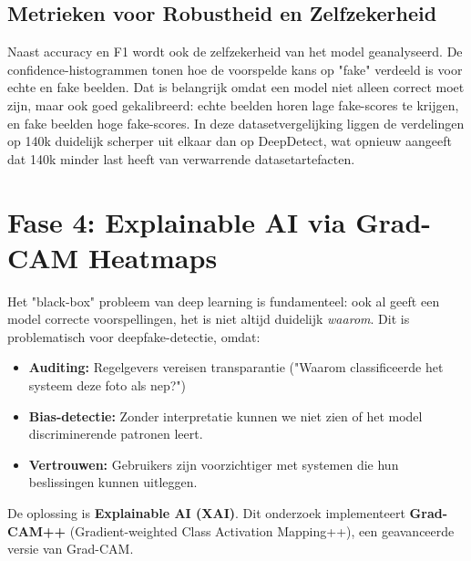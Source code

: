 \subsection{Metrieken voor Robustheid en Zelfzekerheid}

Naast accuracy en F1 wordt ook de zelfzekerheid van het model geanalyseerd. De confidence-histogrammen tonen hoe de voorspelde kans op "fake" verdeeld is voor echte en fake beelden. Dat is belangrijk omdat een model niet alleen correct moet zijn, maar ook goed gekalibreerd: echte beelden horen lage fake-scores te krijgen, en fake beelden hoge fake-scores. In deze datasetvergelijking liggen de verdelingen op 140k duidelijk scherper uit elkaar dan op DeepDetect, wat opnieuw aangeeft dat 140k minder last heeft van verwarrende datasetartefacten.



\section{Fase 4: Explainable AI via Grad-CAM Heatmaps}
\label{sec:fase4}

Het "black-box" probleem van deep learning is fundamenteel: ook al geeft een model correcte voorspellingen, het is niet altijd duidelijk \textit{waarom}. Dit is problematisch voor deepfake-detectie, omdat:

\begin{itemize}
    \item \textbf{Auditing:} Regelgevers vereisen transparantie ("Waarom classificeerde het systeem deze foto als nep?")
    \item \textbf{Bias-detectie:} Zonder interpretatie kunnen we niet zien of het model discriminerende patronen leert.
    \item \textbf{Vertrouwen:} Gebruikers zijn voorzichtiger met systemen die hun beslissingen kunnen uitleggen.
\end{itemize}

De oplossing is \textbf{Explainable AI (XAI)}. Dit onderzoek implementeert \textbf{Grad-CAM++} (Gradient-weighted Class Activation Mapping++), een geavanceerde versie van Grad-CAM.


